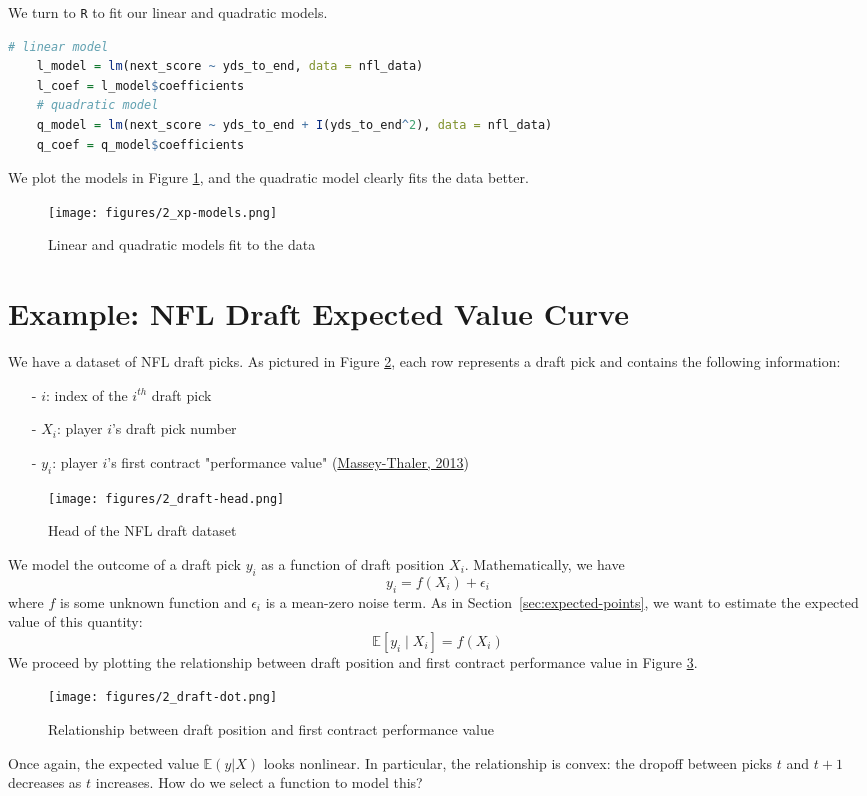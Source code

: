 \documentclass[twoside]{article}
\theoremstyle{definition}
\begin{document}
We turn to \texttt{R} to fit our linear and quadratic models.
\begin{lstlisting}[language=R]
    # linear model
    l_model = lm(next_score ~ yds_to_end, data = nfl_data)
    l_coef = l_model$coefficients
    # quadratic model
    q_model = lm(next_score ~ yds_to_end + I(yds_to_end^2), data = nfl_data)
    q_coef = q_model$coefficients
\end{lstlisting}
We plot the models in Figure \ref{fig:xp-models}, and the quadratic model clearly fits the data better.
\begin{figure}[H]
    \centering
    \texttt{[image: figures/2\_xp-models.png]}
    \caption{Linear and quadratic models fit to the data}
    \label{fig:xp-models}
\end{figure}

\section{Example: NFL Draft Expected Value Curve}

We have a dataset of NFL draft picks. As pictured in Figure \ref{fig:draft-head}, each row represents a draft pick and contains the following information:
\begin{itemize} 
    \item[-] $i$: index of the $i^{th}$ draft pick
    \item[-] $X_i$: player $i$'s draft pick number
    \item[-] $y_i$: player $i$'s first contract "performance value" (\href{https://faculty.wharton.upenn.edu/wp-content/uploads/2013/08/massey---thaler---losers-curse---management-science-july-2013.pdf}{Massey-Thaler, 2013})
\end{itemize}

\begin{figure}[H]
    \centering
    \texttt{[image: figures/2\_draft-head.png]}
    \caption{Head of the NFL draft dataset}
    \label{fig:draft-head}
\end{figure}
We model the outcome of a draft pick $y_i$ as a function of draft position $X_i$. Mathematically, we have
\begin{equation}
    y_i = f(X_i) + \epsilon_i
\end{equation}
where $f$ is some unknown function and $\epsilon_i$ is a mean-zero noise term. As in Section~\ref{sec:expected-points}, we want to estimate the expected value of this quantity:
\begin{equation}
    \mathbb{E}[y_i \mid X_i] = f(X_i)
\end{equation}
We proceed by plotting the relationship between draft position and first contract performance value in Figure \ref{fig:draft-dot}.
\begin{figure}[H]
    \centering
    \texttt{[image: figures/2\_draft-dot.png]}
    \caption{Relationship between draft position and first contract performance value}
    \label{fig:draft-dot}
\end{figure}
Once again, the expected value $\mathbb{E}(y|X)$ looks nonlinear. In particular, the relationship is convex: the dropoff between picks $t$ and $t+1$ decreases as $t$ increases. How do we select a function to model this?
\end{document}
